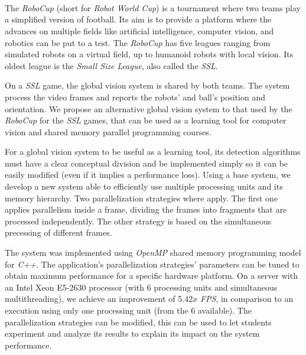 \ \\
\ \\
\label{pagsumm}
\\
\ \\
\ \\

\ \\

\ \\
\ \\

The \emph{RoboCup} (short for \emph{Robot World Cup}) is a tournament where two
teams play a simplified version of football. Its aim is to provide a platform
where the advances on multiple fields like artificial intelligence, computer
vision, and robotics can be put to a test. The \emph{RoboCup} has five leagues
ranging from simulated robots on a virtual field, up to humanoid robots with
local vision. Its oldest league is the \emph{Small Size League}, also called the
\emph{SSL}.

On a \emph{SSL} game, the global vision system is shared by both teams. The
system process the video frames and reports the robots' and ball's position and
orientation. We propose an alternative global vision system to that used by the
\emph{RoboCup} for the \emph{SSL} games, that can be used as a learning tool for
computer vision and shared memory parallel programming courses.

For a global vision system to be useful as a learning tool, its detection
algorithms must have a clear conceptual division and be implemented simply so it
can be easily modified (even if it implies a performance loss). Using a base
system, we develop a new system able to efficiently use multiple processing
units and its memory hierarchy. Two parallelization strategies where apply. The
first one applies parallelism inside a frame, dividing the frames into fragments
that are processed independently. The other strategy is based on the
simultaneous precessing of different frames.

The system was implemented using \emph{OpenMP} shared memory programming model
for \emph{C++}. The application's parallelization strategies' parameters can be
tuned to obtain maximum performance for a specific hardware platform. On a
server with an Intel Xeon E5-2630 processor (with 6 processing units and
simultaneous multithreading), we achieve an improvement of 5.42$x$ \emph{FPS},
in comparison to an execution using only one processing unit (from the 6
available). The parallelization strategies can be modified, this can be used to
let students experiment and analyze its results to explain its impact on the
system performance.

\vfill
\pagebreak
